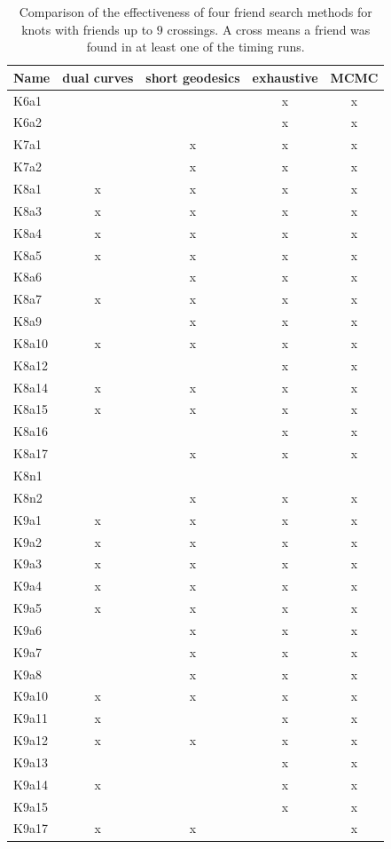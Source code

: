 \documentclass{amsart} %
\theoremstyle{thm}
\theoremstyle{definition}
\numberwithin{equation}{section}
\begin{document}
{\fontsize{9}{11}\selectfont
\begin{table}[htbp] 
\caption{Comparison of the effectiveness of four friend search methods for knots with friends up to $9$ crossings. A cross means a friend was found in at least one of the timing runs.}
\label{tab:comparison}
\begin{tabular}{l|c|c|c|c}
Name & dual curves & short geodesics & exhaustive & MCMC \\
\hline
\hline
K6a1&&&x&x \\
\hline
K6a2&&&x&x \\
\hline
K7a1&&x&x&x \\
\hline
K7a2&&x&x&x \\
\hline
K8a1&x&x&x&x \\
\hline
K8a3&x&x&x&x \\
\hline
K8a4&x&x&x&x \\
\hline
K8a5&x&x&x&x \\
\hline
K8a6&&x&x&x \\
\hline
K8a7&x&x&x&x \\
\hline
K8a9&&x&x&x \\
\hline
K8a10&x&x&x&x \\
\hline
K8a12&&&x&x \\
\hline
K8a14&x&x&x&x \\
\hline
K8a15&x&x&x&x \\
\hline
K8a16&&&x&x \\
\hline
K8a17&&x&x&x \\
\hline
K8n1&&&& \\
\hline
K8n2&&x&x&x \\
\hline
K9a1&x&x&x&x \\
\hline
K9a2&x&x&x&x \\
\hline
K9a3&x&x&x&x \\
\hline
K9a4&x&x&x&x \\
\hline
K9a5&x&x&x&x \\
\hline
K9a6&&x&x&x \\
\hline
K9a7&&x&x&x \\
\hline
K9a8&&x&x& x\\
\hline
K9a10&x&x&x&x \\
\hline
K9a11&x&&x&x \\
\hline
K9a12&x&x&x&x \\
\hline
K9a13&&&x&x \\
\hline
K9a14&x&&x&x \\
\hline
K9a15&&&x&x \\
\hline
K9a17&x&x&&x \\
\hline

\end{tabular}
\end{table}}
\end{document}
